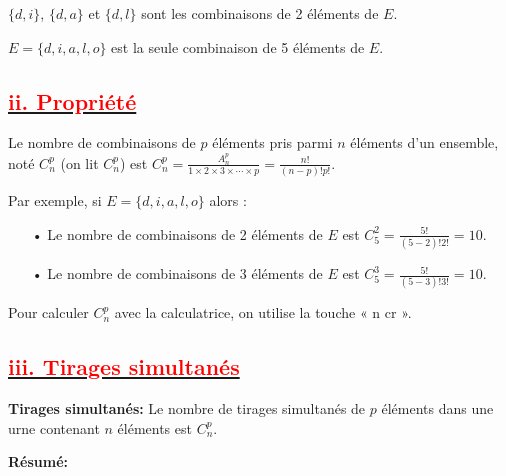 \documentclass[12pt]{article}
\begin{document}
$\{d, i\}$, $\{d, a\}$ et $\{d, l\}$ sont les combinaisons de 2 éléments de $E$.

$E = \{d, i, a, l, o\}$ est la seule combinaison de 5 éléments de $E$.
\subsection*{\underline{\textbf{\textcolor{red}{ii. Propriété }}}}
Le nombre de combinaisons de $p$ éléments pris parmi $n$ éléments d'un ensemble, noté $C_{n}^{p}$ (on lit $C_{n}^{p}$) est $C_{n}^{p} = \frac{A_{n}^{p}}{1 \times 2 \times 3 \times \cdots \times p}=\frac{n!}{(n-p)!p!}$.

Par exemple, si $E = \{d, i, a, l, o\}$ alors :
\begin{itemize}
  \item[•] Le nombre de combinaisons de 2 éléments de $E$ est $C_{5}^{2} = \frac{5!}{(5-2)!2!} = 10$.
  \item[•] Le nombre de combinaisons de 3 éléments de $E$ est $C_{5}^{3} = \frac{5!}{(5-3)!3!} = 10$.
\end{itemize}
Pour calculer $C_{n}^{p}$ avec la calculatrice, on utilise la touche « n cr ».
\subsection*{\underline{\textbf{\textcolor{red}{iii. Tirages simultanés}}}}
\textbf{Tirages simultanés:} Le nombre de tirages simultanés de $p$ éléments dans une urne contenant $n$ éléments est $C_{n}^{p}$.

\textbf{Résumé:}
\end{document}
